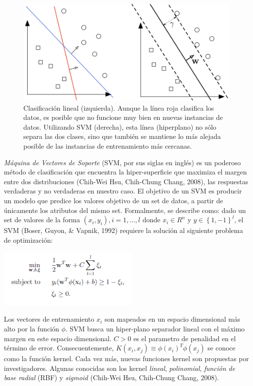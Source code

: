 \begin{figure}
    \centering
    \includegraphics[scale=0.5]{figuras/Capture1.PNG}
    \caption{Clasificación lineal (izquierda). Aunque la línea roja clasifica los datos, es posible que no funcione muy bien en nuevas instancias de datos.  Utilizando SVM (derecha), esta línea (hiperplano) no sólo separa las dos clases, sino que también se mantiene lo más alejada posible de las instancias de entrenamiento más cercanas.} %
    \label{fig:my_label}
\end{figure}

\textit{Máquina de Vectores de Soporte} (SVM, por sus siglas en inglés) es un poderoso método de clasificación que encuentra la hiper-superficie que maximiza el margen entre dos distribuciones (Chih-Wei Hsu, Chih-Chung Chang, 2008), las respuestas verdaderas y no verdaderas en nuestro caso. El objetivo de un SVM es producir un modelo que predice los valores objetivo de un set de datos, a partir de únicamente los atributos del mismo set.  Formalmente, se describe como: dado un set de valores de la forma $(x_i,y_i), i=1, ..., l$  donde  $x_i \in R^n$ y $y\in\left\lbrace1,-1\right\rbrace^l$, el SVM (Boser, Guyon, \& Vapnik, 1992) requiere la solución al siguiente problema de optimización: 
\begin{center}
\includegraphics[height=1.15in]{figuras/Imagen1.png}
\end{center}
Los vectores de entrenamiento $x_i$ son mapeados en un espacio dimensional más alto por la función $\phi$. SVM busca un hiper-plano separador lineal con el máximo margen en este espacio dimensional. $C > 0$ es el parametro de penalidad en el término de error. Consecuentemente, $K(x_i,x_j)\equiv \phi(x_i )^T \phi(x_j)$ se conoce como la función kernel. Cada vez más, nuevas funciones kernel son propuestas por investigadores. Algunas conocidas son los kernel \textit{lineal}, \textit{polinomial}, \textit{función de base radial} (RBF) y \textit{sigmoid} (Chih-Wei Hsu, Chih-Chung Chang, 2008). 

